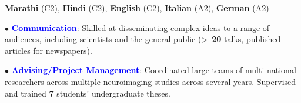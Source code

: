 \documentclass[10pt]{article}
\begin{document}
	\textbf{Marathi} (C2), \textbf{Hindi} (C2), \textbf{English} (C2), \textbf{Italian} (A2), \textbf{German} (A2)
	
	
	$\bullet$ \textcolor{blue}{\textbf{Communication}}: Skilled	at	disseminating complex ideas to a range of audiences, including scientists and \hspace*{0.1in}the general public (\textgreater ~\textbf{20} talks, published articles for newspapers).	
	\miniskip
	
	$\bullet$ \textcolor{blue}{\textbf{Advising/Project Management}}: Coordinated large teams of multi-national researchers across multiple \hspace*{0.1in}neuroimaging studies across several years. Supervised and trained \textbf{7} students' undergraduate theses.
	
	
\end{document}
